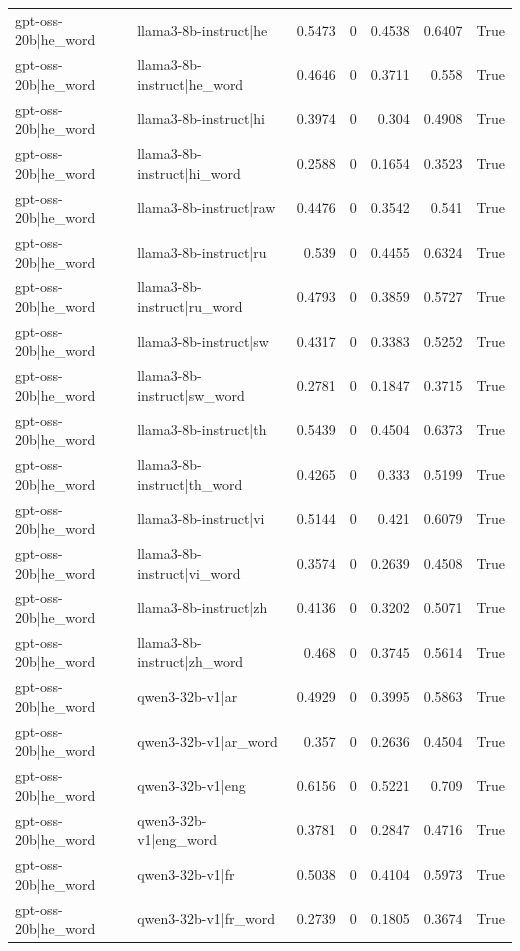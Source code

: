 \begin{table}
\begin{tabular}{l l r r r r l}
gpt-oss-20b|he_word & llama3-8b-instruct|he & 0.5473 & 0 & 0.4538 & 0.6407 & True \\
gpt-oss-20b|he_word & llama3-8b-instruct|he_word & 0.4646 & 0 & 0.3711 & 0.558 & True \\
gpt-oss-20b|he_word & llama3-8b-instruct|hi & 0.3974 & 0 & 0.304 & 0.4908 & True \\
gpt-oss-20b|he_word & llama3-8b-instruct|hi_word & 0.2588 & 0 & 0.1654 & 0.3523 & True \\
gpt-oss-20b|he_word & llama3-8b-instruct|raw & 0.4476 & 0 & 0.3542 & 0.541 & True \\
gpt-oss-20b|he_word & llama3-8b-instruct|ru & 0.539 & 0 & 0.4455 & 0.6324 & True \\
gpt-oss-20b|he_word & llama3-8b-instruct|ru_word & 0.4793 & 0 & 0.3859 & 0.5727 & True \\
gpt-oss-20b|he_word & llama3-8b-instruct|sw & 0.4317 & 0 & 0.3383 & 0.5252 & True \\
gpt-oss-20b|he_word & llama3-8b-instruct|sw_word & 0.2781 & 0 & 0.1847 & 0.3715 & True \\
gpt-oss-20b|he_word & llama3-8b-instruct|th & 0.5439 & 0 & 0.4504 & 0.6373 & True \\
gpt-oss-20b|he_word & llama3-8b-instruct|th_word & 0.4265 & 0 & 0.333 & 0.5199 & True \\
gpt-oss-20b|he_word & llama3-8b-instruct|vi & 0.5144 & 0 & 0.421 & 0.6079 & True \\
gpt-oss-20b|he_word & llama3-8b-instruct|vi_word & 0.3574 & 0 & 0.2639 & 0.4508 & True \\
gpt-oss-20b|he_word & llama3-8b-instruct|zh & 0.4136 & 0 & 0.3202 & 0.5071 & True \\
gpt-oss-20b|he_word & llama3-8b-instruct|zh_word & 0.468 & 0 & 0.3745 & 0.5614 & True \\
gpt-oss-20b|he_word & qwen3-32b-v1|ar & 0.4929 & 0 & 0.3995 & 0.5863 & True \\
gpt-oss-20b|he_word & qwen3-32b-v1|ar_word & 0.357 & 0 & 0.2636 & 0.4504 & True \\
gpt-oss-20b|he_word & qwen3-32b-v1|eng & 0.6156 & 0 & 0.5221 & 0.709 & True \\
gpt-oss-20b|he_word & qwen3-32b-v1|eng_word & 0.3781 & 0 & 0.2847 & 0.4716 & True \\
gpt-oss-20b|he_word & qwen3-32b-v1|fr & 0.5038 & 0 & 0.4104 & 0.5973 & True \\
gpt-oss-20b|he_word & qwen3-32b-v1|fr_word & 0.2739 & 0 & 0.1805 & 0.3674 & True \\

\end{tabular}
\end{table}
